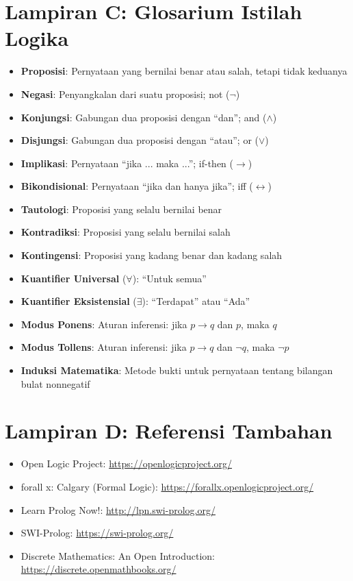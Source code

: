 \section*{Lampiran C: Glosarium Istilah Logika}
\begin{itemize}
  \item \textbf{Proposisi}: Pernyataan yang bernilai benar atau salah, tetapi tidak keduanya
  \item \textbf{Negasi}: Penyangkalan dari suatu proposisi; not ($\neg$)
  \item \textbf{Konjungsi}: Gabungan dua proposisi dengan ``dan''; and ($\wedge$)
  \item \textbf{Disjungsi}: Gabungan dua proposisi dengan ``atau''; or ($\vee$)
  \item \textbf{Implikasi}: Pernyataan ``jika ... maka ...''; if-then ($\rightarrow$)
  \item \textbf{Bikondisional}: Pernyataan ``jika dan hanya jika''; iff ($\leftrightarrow$)
  \item \textbf{Tautologi}: Proposisi yang selalu bernilai benar
  \item \textbf{Kontradiksi}: Proposisi yang selalu bernilai salah
  \item \textbf{Kontingensi}: Proposisi yang kadang benar dan kadang salah
  \item \textbf{Kuantifier Universal} ($\forall$): ``Untuk semua''
  \item \textbf{Kuantifier Eksistensial} ($\exists$): ``Terdapat'' atau ``Ada''
  \item \textbf{Modus Ponens}: Aturan inferensi: jika $p \rightarrow q$ dan $p$, maka $q$
  \item \textbf{Modus Tollens}: Aturan inferensi: jika $p \rightarrow q$ dan $\neg q$, maka $\neg p$
  \item \textbf{Induksi Matematika}: Metode bukti untuk pernyataan tentang bilangan bulat nonnegatif
\end{itemize}

\section*{Lampiran D: Referensi Tambahan}
\begin{itemize}
  \item Open Logic Project: \url{https://openlogicproject.org/}
  \item forall x: Calgary (Formal Logic): \url{https://forallx.openlogicproject.org/}
  \item Learn Prolog Now!: \url{http://lpn.swi-prolog.org/}
  \item SWI-Prolog: \url{https://swi-prolog.org/}
  \item Discrete Mathematics: An Open Introduction: \url{https://discrete.openmathbooks.org/}
\end{itemize}
